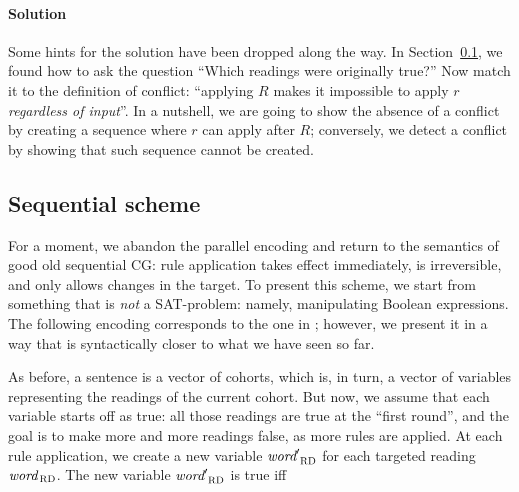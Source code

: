 
\paragraph{Solution}
Some hints for the solution have been dropped along the way. 
In Section~\ref{sec:orderedScheme}, we found how to ask the question 
``Which readings were originally true?'' Now match it to the definition of conflict: ``applying $R$ makes it impossible to apply $r$ \emph{regardless of input}''.
In a nutshell, we are going to show the absence of a conflict by creating 
a sequence where $r$ can apply after $R$; conversely, we detect a conflict by 
showing that such sequence cannot be created.




\def\newVar{$\text{\em word}'_\textsc{ RD}$}
\def\oldVar{$\text{\em word}_\textsc{\,RD}$}
\def\eqdef{\Coloneqq}
\def\invConds{\text{invalid condition}}
\def\onlyTrgLeft{\text{only target left}}

\subsection{Sequential scheme}
\label{sec:orderedScheme}

For a moment, we abandon the parallel encoding and return to the semantics of good old sequential CG: rule application takes effect immediately, is irreversible, and only allows changes in the target.
To present this scheme, we start from something that is \emph{not} a SAT-problem: namely, manipulating Boolean expressions. The following encoding corresponds to the one in \cite{lager_nivre01} ; however, we present it in a way that is syntactically closer to what we have seen so far.

As before, a sentence is a vector of cohorts, which is, in turn, a vector of variables representing the readings of the current cohort.
But now, we assume that each variable starts off as true: 
all those readings are true at the ``first round'', and the goal is to make more and more readings false, as more rules are applied.
At each rule application, we create a new variable \newVar{} for each targeted reading \oldVar{}.
The new variable \newVar{} is true iff 

